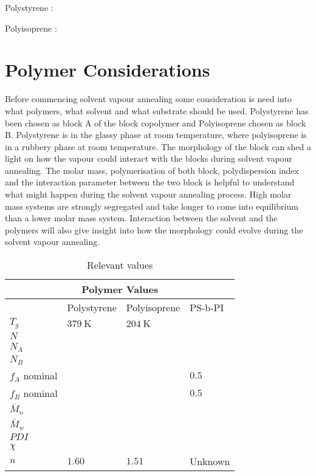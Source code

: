 \documentclass[MasterThesisMain.tex]{subfiles}
\begin{document}
\setpolymerdelim[]
Polystyrene :
\bigskip


\setpolymerdelim[]
Polyisoprene :


\section{Polymer Considerations}
Before commencing solvent vapour annealing some consideration is need into what polymers, what solvent and what substrate should be used. Polystyrene has been chosen as block A of the block copolymer and Polyisoprene chosen as block B. Polystyrene is in the glassy phase at room temperature, where polyisoprene is in a rubbery phase at room temperature. The morphology of the block can shed a light on how the vapour could interact with the blocks during solvent vapour annealing. The molar mass, polymerisation of both block, polydispersion index and the interaction parameter between the two block is helpful to understand what might happen during the solvent vapour annealing process. High molar mass systems are strongly segregated and take longer to come into equilibrium than a lower molar mass system. Interaction between the solvent and the polymers will also give insight into how the morphology could evolve during the solvent vapour annealing.

\begin{table}
	\caption{Relevant values}
\begin{tabular}{ |p{3cm}||p{3cm}|p{3cm}|p{3cm}|  }
 \hline
 \multicolumn{4}{|c|}{Polymer Values} \\
 \hline
    & Polystyrene & Polyisoprene & PS-b-PI\\
 \hline
 $T_g$& $\SI{379}{\kelvin}$   & $\SI{204}{\kelvin}$  &   \\
 $N$&  &  &  \\
 $N_A$&  &  &  \\
 $N_B$&  &  &  \\
 $f_A$ nominal&  &  & $0.5$  \\
 $f_B$ nominal&  &  & $0.5$  \\
 $\bar{M}_n$&  &  &  \\
 $\bar{M}_w$&  &  &  \\
 $PDI$&  &  &  \\
 $\chi$&  &  &  \\
 $n$& $1.60$ & $1.51$ & Unknown\\
 \hline
\end{tabular}
\end{table}
\end{document}
